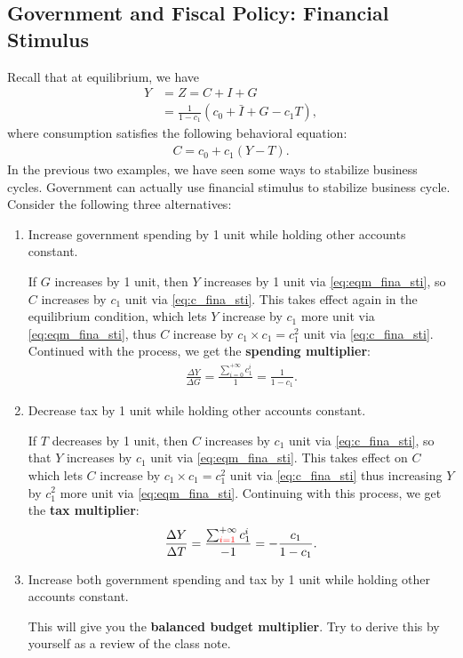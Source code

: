 \documentclass[12pt]{article}
\begin{document}
\subsection*{Government and Fiscal Policy: Financial Stimulus}
Recall that at equilibrium, we have
\begin{align}
    Y &= Z = C + I + G \label{eq:eqm_fina_sti} \\
    &= \frac{1}{1-c_1}(c_0 + \bar{I} + G - c_1T),\label{eq:y_fina_sti}
\end{align}
where consumption satisfies the following behavioral equation:
\begin{align}\label{eq:c_fina_sti}
    C = c_0 + c_1(Y-T).
\end{align}
In the previous two examples, we have seen some ways to stabilize business cycles. Government can actually use financial stimulus to stabilize business cycle. Consider the following three alternatives:
\begin{enumerate}[label=(\arabic*)]
    \item Increase government spending by 1 unit while holding other accounts constant.
    
    If $G$ increases by 1 unit, then $Y$ increases by 1 unit via \eqref{eq:eqm_fina_sti}, so $C$ increases by $c_1$ unit via \eqref{eq:c_fina_sti}. This takes effect again in the equilibrium condition, which lets $Y$ increase by $c_1$ more unit via \eqref{eq:eqm_fina_sti}, thus $C$ increase by $c_1 \times c_1 = c_1^2$ unit via \eqref{eq:c_fina_sti}. Continued with the process, we get the \textbf{spending multiplier}:
    \begin{align*}
        \frac{\Delta Y}{\Delta G} = \frac{\sum_{i=0}^{+\infty}c_1^i}{1} = \frac{1}{1-c_1}.
    \end{align*}

    \item Decrease tax by 1 unit while holding other accounts constant.
    
    If $T$ decreases by 1 unit, then $C$ increases by $c_1$ unit via \eqref{eq:c_fina_sti}, so that $Y$ increases by $c_1$ unit via \eqref{eq:eqm_fina_sti}. This takes effect on $C$ which lets $C$ increase by $c_1\times c_1 = c_1^2$ unit via \eqref{eq:c_fina_sti} thus increasing $Y$ by $c_1^2$ more unit via \eqref{eq:eqm_fina_sti}. Continuing with this process, we get the \textbf{tax multiplier}:
    \begin{align*}
        \frac{\Delta Y}{\Delta T} = \frac{\sum_{{\color{red} i=1}}^{+\infty}c_1^i}{-1} = -\frac{c_1}{1-c_1}.
    \end{align*}

    \item Increase both government spending and tax by 1 unit while holding other accounts constant.
    
    This will give you the \textbf{balanced budget multiplier}. Try to derive this by yourself as a review of the class note.
\end{enumerate}
\end{document}
